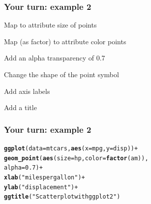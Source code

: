 \documentclass[12pt]{beamer}\usepackage[]{graphicx}\usepackage[]{color}
\makeatletter
\newcommand{\hlnum}[1]{\textcolor[rgb]{0.686,0.059,0.569}{#1}}%
\newcommand{\hlstr}[1]{\textcolor[rgb]{0.192,0.494,0.8}{#1}}%
\newcommand{\hlopt}[1]{\textcolor[rgb]{0,0,0}{#1}}%
\newcommand{\hlstd}[1]{\textcolor[rgb]{0.345,0.345,0.345}{#1}}%
\newcommand{\hlkwc}[1]{\textcolor[rgb]{0.333,0.667,0.333}{#1}}%
\newcommand{\hlkwd}[1]{\textcolor[rgb]{0.737,0.353,0.396}{\textbf{#1}}}%
\newenvironment{kframe}{%
 \def\at@end@of@kframe{}%
 \ifinner\ifhmode%
  \def\at@end@of@kframe{\end{minipage}}%
  \begin{minipage}{\columnwidth}%
 \fi\fi%
 \def\FrameCommand##1{\hskip\@totalleftmargin \hskip-\fboxsep
 \colorbox{shadecolor}{##1}\hskip-\fboxsep
     \hskip-\linewidth \hskip-\@totalleftmargin \hskip\columnwidth}%
 \MakeFramed {\advance\hsize-\width
   \@totalleftmargin\z@ \linewidth\hsize
   \@setminipage}}%
 {\par\unskip\endMakeFramed%
 \at@end@of@kframe}
\newenvironment{knitrout}{}{} %
\makeatother
\begin{document}

\begin{frame}[fragile]
\frametitle{Your turn: example 2}
\bi
  \item Map  to attribute size of points
  \item Map  (as factor) to attribute color points
  \item Add an alpha transparency of 0.7
  \item Change the shape of the point symbol
  \item Add axis labels
  \item Add a title
\ei
\end{frame}


\begin{frame}[fragile]
\frametitle{Your turn: example 2}
\begin{knitrout}\footnotesize
{}\color{fgcolor}\begin{kframe}
\begin{alltt}
\hlkwd{ggplot}\hlstd{(}\hlkwc{data} \hlstd{= mtcars,} \hlkwd{aes}\hlstd{(}\hlkwc{x} \hlstd{= mpg,} \hlkwc{y} \hlstd{= disp))} \hlopt{+}
  \hlkwd{geom_point}\hlstd{(}\hlkwd{aes}\hlstd{(}\hlkwc{size} \hlstd{= hp,} \hlkwc{color} \hlstd{=} \hlkwd{factor}\hlstd{(am)),}
             \hlkwc{alpha} \hlstd{=} \hlnum{0.7}\hlstd{)} \hlopt{+}
  \hlkwd{xlab}\hlstd{(}\hlstr{"miles per gallon"}\hlstd{)} \hlopt{+}
  \hlkwd{ylab}\hlstd{(}\hlstr{"displacement"}\hlstd{)} \hlopt{+}
  \hlkwd{ggtitle}\hlstd{(}\hlstr{"Scatter plot with ggplot2"}\hlstd{)}
\end{alltt}
\end{kframe}
\end{knitrout}
\end{frame}

\end{document}
